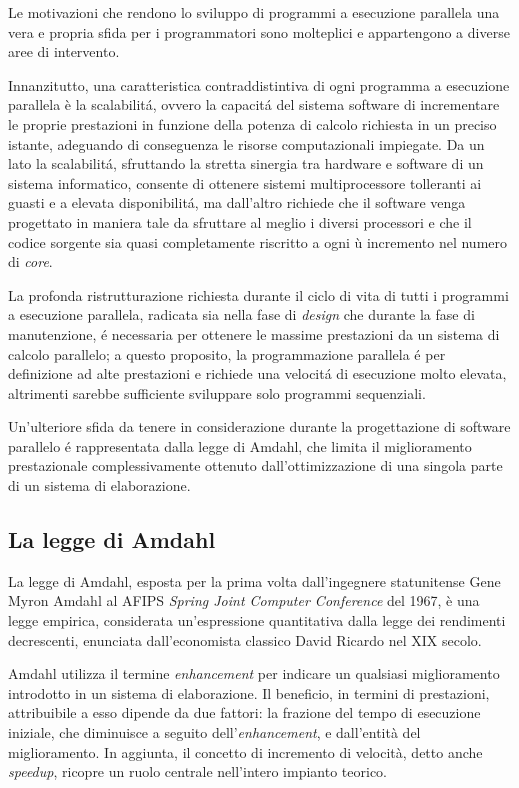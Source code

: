 Le motivazioni che rendono lo sviluppo di programmi a esecuzione parallela una vera e propria sfida per i programmatori 
sono molteplici e appartengono a diverse aree di intervento.

Innanzitutto, una caratteristica contraddistintiva di ogni programma a esecuzione parallela
è la scalabilit\'a, ovvero la capacit\'a del sistema software di incrementare le proprie prestazioni in funzione della potenza 
di calcolo richiesta in un preciso istante, adeguando di conseguenza le risorse computazionali impiegate\cite{Michael2007}.\newline
Da un lato la scalabilit\'a, sfruttando la stretta sinergia tra hardware e software di un sistema informatico, consente di ottenere 
sistemi multiprocessore tolleranti ai guasti e a elevata disponibilit\'a, ma dall'altro richiede che il software venga progettato 
in maniera tale da sfruttare al meglio i diversi processori e che il codice sorgente sia quasi completamente riscritto a ogni ù
incremento nel numero di \textit{core}.

La profonda ristrutturazione richiesta durante il ciclo di vita di tutti i  programmi a esecuzione parallela, radicata sia nella 
fase di \textit{design} che durante la fase di manutenzione, \'e necessaria per ottenere le massime prestazioni da un 
sistema di calcolo parallelo; a questo proposito, la programmazione parallela \'e per definizione ad alte prestazioni e richiede una 
velocit\'a di esecuzione molto elevata, altrimenti sarebbe sufficiente sviluppare solo programmi sequenziali.

Un'ulteriore sfida da tenere in considerazione durante la progettazione di software parallelo \'e rappresentata dalla legge di
Amdahl, che limita il miglioramento prestazionale complessivamente ottenuto dall'ottimizzazione di una singola parte di un sistema di
elaborazione.
\subsection{La legge di Amdahl}
La legge di Amdahl, esposta per la prima volta dall’ingegnere statunitense Gene Myron Amdahl al AFIPS \textit{Spring Joint Computer
    Conference} del 1967, è una legge empirica, considerata un'espressione quantitativa dalla legge dei rendimenti decrescenti,
enunciata dall’economista classico David Ricardo nel XIX secolo.

Amdahl utilizza il termine \textit{enhancement} per indicare un qualsiasi miglioramento introdotto in un sistema di
elaborazione.\newline
Il beneficio, in termini di prestazioni, attribuibile a esso dipende da due fattori: la frazione del tempo di esecuzione iniziale,
che diminuisce a seguito dell'\textit{enhancement}, e dall'entità del miglioramento.\newline
In aggiunta, il concetto di incremento di velocità, detto anche \textit{speedup}, ricopre un ruolo centrale nell'intero impianto teorico.


